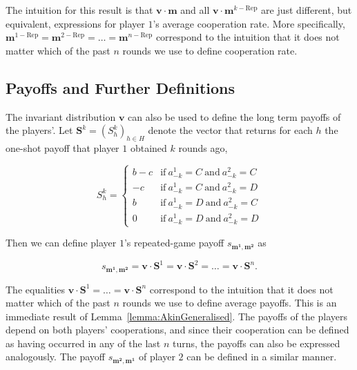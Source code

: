 \documentclass{article}
\theoremstyle{definition}
\begin{document}
The intuition for this result is that $\mathbf{v}\cdot \mathbf{m}$ and all
$\mathbf{v}\cdot \mathbf{m}^{k-\text{Rep}}$ are just different, but equivalent,
expressions for player $1$'s average cooperation rate. More specifically,
\(\mathbf{m}^{1-\text{Rep}} = \mathbf{m}^{2-\text{Rep}} = \dots =
\mathbf{m}^{n-\text{Rep}}\) correspond to the intuition that it does not matter
which of the past $n$ rounds we use to define cooperation rate.


\subsection{Payoffs and Further Definitions}

The invariant distribution $\mathbf{v}$ can also be used to define the long term
payoffs of the players'. Let $\mathbf{S}^k = (S_h^k)_{h\in H}$ denote the vector
that returns for each $h$ the one-shot payoff that player $1$ obtained $k$
rounds ago,

\begin{equation}
    S_h^k = \left\{
    \begin{array}{cl}
    b-c	&\text{if}~ a_{-k}^1=C~\text{and}~ a_{-k}^2=C\\
    -c	&\text{if}~ a_{-k}^1=C~\text{and}~ a_{-k}^2=D\\
    b	&\text{if}~ a_{-k}^1=D~\text{and}~ a_{-k}^2=C\\
    0	&\text{if}~ a_{-k}^1=D~\text{and}~ a_{-k}^2=D
    \end{array}
    \right.
\end{equation}

Then we can define player $1$'s repeated-game payoff $s_{\mathbf{m^{1}},\mathbf{m^{2}}}$ as

\begin{equation} \label{Eq:Payoff}
s_{\mathbf{m^{1}},\mathbf{m^{2}}}  = \mathbf{v}\cdot \mathbf{S}^1 = \mathbf{v}\cdot \mathbf{S}^2 = \ldots = \mathbf{v} \cdot \mathbf{S}^n.
\end{equation}

The equalities $\mathbf{v}\cdot \mathbf{S}^1 = \ldots = \mathbf{v} \cdot
\mathbf{S}^n$ correspond to the intuition that it does not matter which of the
past $n$ rounds we use to define average payoffs. This is an immediate result of
Lemma~\ref{lemma:AkinGeneralised}. The payoffs of the players depend on both
players' cooperations, and since their cooperation can be defined as having
occurred in any of the last $n$ turns, the payoffs can also be expressed
analogously. The payoff $s_{\mathbf{m^{2}},\mathbf{m^{1}}}$ of player $2$ can be
defined in a similar manner.
\end{document}
